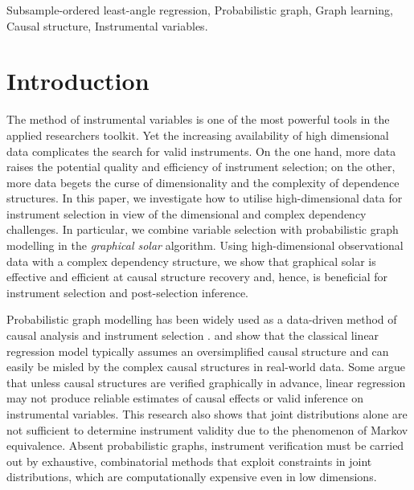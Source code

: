 \documentclass[11pt,review,authoryear]{elsarticle}
\begin{document}
\begin{keyword}
Subsample-ordered least-angle regression, Probabilistic graph, Graph learning, Causal structure, Instrumental variables.
\end{keyword}

\maketitle


\setcounter{footnote}{0}
\setcounter{page}{1}

\section{Introduction}

The method of instrumental variables is one of the most powerful tools in the applied researchers toolkit. Yet the increasing availability of high dimensional data complicates the search for valid instruments. On the one hand, more data raises the potential quality and efficiency of instrument selection; on the other, more data begets the curse of dimensionality and the complexity of dependence structures. In this paper, we investigate how to utilise high-dimensional data for instrument selection in view of the dimensional and complex dependency challenges. In particular, we combine variable selection with probabilistic graph modelling in the \emph{graphical solar} algorithm. Using high-dimensional observational data with a complex dependency structure, we show that graphical solar is effective and efficient at causal structure recovery and, hence, is beneficial for instrument selection and post-selection inference.

Probabilistic graph modelling has been widely used as a data-driven method of causal analysis and instrument selection \citep{verma1990causal, pearl2009causality}. \citet{spirtes2000causation} and \citet{pearl2009causality} show that the classical linear regression model typically assumes an oversimplified causal structure and can easily be misled by the complex causal structures in real-world data. Some argue \citep{brito2002generalized, kuroki2005instrumental, chu2013semi, silva2017learning} that unless causal structures are verified graphically in advance, linear regression may not produce reliable estimates of causal effects or valid inference on instrumental variables. This research also shows that joint distributions alone are not sufficient to determine instrument validity due to the phenomenon of Markov equivalence. Absent probabilistic graphs, instrument verification must be carried out by exhaustive, combinatorial methods that exploit constraints in joint distributions, which are computationally expensive even in low dimensions.
\end{document}
